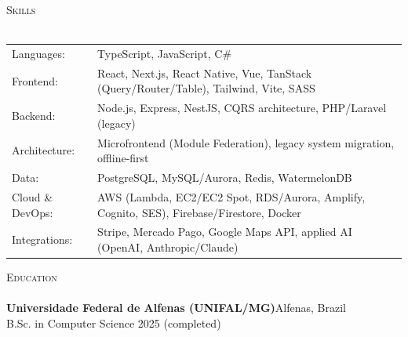 \documentclass[a4paper]{article}
\newcommand{\lineunder}{
    \vspace*{-8pt} \\
    \hspace*{-18pt} \hrulefill \\
}
\newcommand{\header}[1]{
    {\hspace*{-18pt}\vspace*{6pt} \textsc{#1}}
    \vspace*{-6pt} \lineunder
}
\begin{document}
    \vspace{1mm}

    \header{Skills}
    \vspace{2mm}
    \begin{longtable}{p{4cm}p{12cm}}
        Languages: & TypeScript, JavaScript, C\# \\
        Frontend: & React, Next.js, React Native, Vue, TanStack (Query/Router/Table), Tailwind, Vite, SASS \\
        Backend: & Node.js, Express, NestJS, CQRS architecture, PHP/Laravel (legacy) \\
        Architecture: & Microfrontend (Module Federation), legacy system migration, offline-first \\
        Data: & PostgreSQL, MySQL/Aurora, Redis, WatermelonDB \\
        Cloud \& DevOps: & AWS (Lambda, EC2/EC2 Spot, RDS/Aurora, Amplify, Cognito, SES), Firebase/Firestore, Docker \\
        Integrations: & Stripe, Mercado Pago, Google Maps API, applied AI (OpenAI, Anthropic/Claude) \\
    \end{longtable}
    \vspace{1mm}

    \header{Education}
    \vspace{2mm}
    \textbf{Universidade Federal de Alfenas (UNIFAL/MG)}\hfill Alfenas, Brazil\\
    B.Sc. in Computer Science \hfill 2025 (completed)\\
\end{document}
